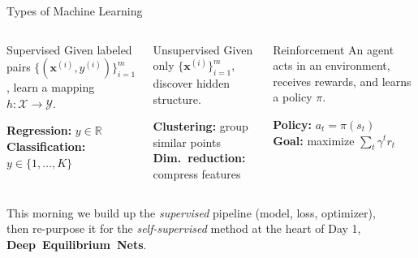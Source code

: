 \documentclass[aspectratio=169,11pt]{beamer}
\newcommand{\x}{\bm{x}}
\newcommand{\R}{\mathbb{R}}
\begin{document}
\begin{frame}{Types of Machine Learning}
\begin{columns}[T]
\begin{block}{\centering Supervised}
    Given labeled pairs $\{(\x^{(i)}, y^{(i)})\}_{i=1}^{m}$, learn a mapping $h:\mathcal{X}\to\mathcal{Y}$.

    \vspace{0.3em}
    \textbf{Regression:} $y\in\R$\\
    \textbf{Classification:} $y\in\{1,\dots,K\}$
\end{block}

\begin{block}{\centering Unsupervised}
    Given only $\{\x^{(i)}\}_{i=1}^{m}$, discover hidden structure.

    \vspace{0.3em}
    \textbf{Clustering:} group similar points\\
    \textbf{Dim.\ reduction:} compress features
\end{block}

\begin{block}{\centering Reinforcement}
    An agent acts in an environment, receives rewards, and learns a policy $\pi$.

    \vspace{0.3em}
    \textbf{Policy:} $a_t = \pi(s_t)$\\
    \textbf{Goal:} maximize $\sum_t \gamma^t r_t$
\end{block}
\end{columns}

\vspace{0.5cm}
\begin{center}
{\small This morning we build up the \emph{supervised} pipeline (model, loss, optimizer),\\
then re-purpose it for the \emph{self-supervised} method at the heart of Day 1, \mbox{\textbf{Deep Equilibrium Nets}}.}
\end{center}
\end{frame}
\end{document}
